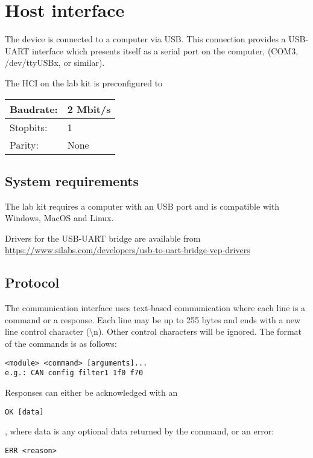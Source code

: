 \documentclass{article}[a4paper]
\begin{document}
\section{Host interface}

The device is connected to a computer via USB. This connection provides a
USB-UART interface which presents itself as a serial port on the computer,
(COM3, /dev/ttyUSBx, or similar).

The HCI on the lab kit is preconfigured to

\medskip
\noindent
\begin{tabularx}{\textwidth}{|p{3cm}|X|}
\hline
Baudrate: & 2 Mbit/s \\
\hline
Stopbits: & 1 \\
\hline
Parity: & None \\
\hline
\end{tabularx}

\subsection{System requirements}

The lab kit requires a computer with an USB port and is compatible with Windows,
MacOS and Linux.

Drivers for the USB-UART bridge are available from
\url{https://www.silabs.com/developers/usb-to-uart-bridge-vcp-drivers}

\subsection{Protocol}

The communication interface uses text-based communication where each line is a
command or a response. Each line may be up to 255 bytes and ends with a new
line control character
(\textbackslash n). Other control characters will be ignored. The format of
the commands is as follows:
\begin{verbatim}
<module> <command> [arguments]...
e.g.: CAN config filter1 1f0 f70
\end{verbatim}

Responses can either be acknowledged with an
\begin{verbatim}
OK [data]
\end{verbatim}
, where data is any optional data returned by the command, or an error:
\begin{verbatim}
ERR <reason>
\end{verbatim}
\end{document}

